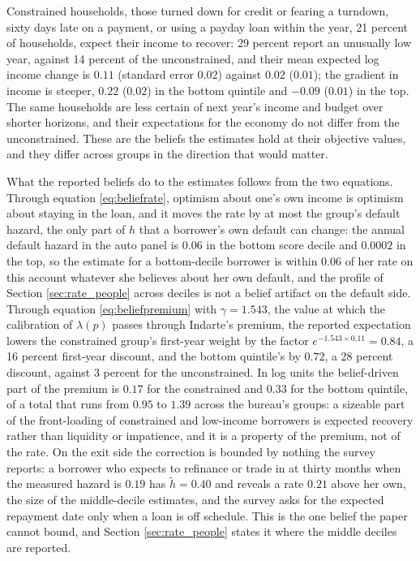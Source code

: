 Constrained households, those turned down for credit or fearing a turndown, sixty days late on a payment, or using a payday loan within the year, 21 percent of households, expect their income to recover: 29 percent report an unusually low year, against 14 percent of the unconstrained, and their mean expected log income change is $0.11$ (standard error $0.02$) against $0.02$ ($0.01$); the gradient in income is steeper, $0.22$ ($0.02$) in the bottom quintile and $-0.09$ ($0.01$) in the top. The same households are less certain of next year's income and budget over shorter horizons, and their expectations for the economy do not differ from the unconstrained. These are the beliefs the estimates hold at their objective values, and they differ across groups in the direction that would matter.

What the reported beliefs do to the estimates follows from the two equations. Through equation \eqref{eq:beliefrate}, optimism about one's own income is optimism about staying in the loan, and it moves the rate by at most the group's default hazard, the only part of $h$ that a borrower's own default can change: the annual default hazard in the auto panel is $0.06$ in the bottom score decile and $0.0002$ in the top, so the estimate for a bottom-decile borrower is within $0.06$ of her rate on this account whatever she believes about her own default, and the profile of Section \ref{sec:rate_people} across deciles is not a belief artifact on the default side. Through equation \eqref{eq:beliefpremium} with $\gamma = 1.543$, the value at which the calibration of $\lambda(p)$ passes through Indarte's premium, the reported expectation lowers the constrained group's first-year weight by the factor $e^{-1.543 \times 0.11} = 0.84$, a 16 percent first-year discount, and the bottom quintile's by $0.72$, a 28 percent discount, against 3 percent for the unconstrained. In log units the belief-driven part of the premium is $0.17$ for the constrained and $0.33$ for the bottom quintile, of a total that runs from $0.95$ to $1.39$ across the bureau's groups: a sizeable part of the front-loading of constrained and low-income borrowers is expected recovery rather than liquidity or impatience, and it is a property of the premium, not of the rate. On the exit side the correction is bounded by nothing the survey reports: a borrower who expects to refinance or trade in at thirty months when the measured hazard is $0.19$ has $\tilde h = 0.40$ and reveals a rate $0.21$ above her own, the size of the middle-decile estimates, and the survey asks for the expected repayment date only when a loan is off schedule. This is the one belief the paper cannot bound, and Section \ref{sec:rate_people} states it where the middle deciles are reported.

